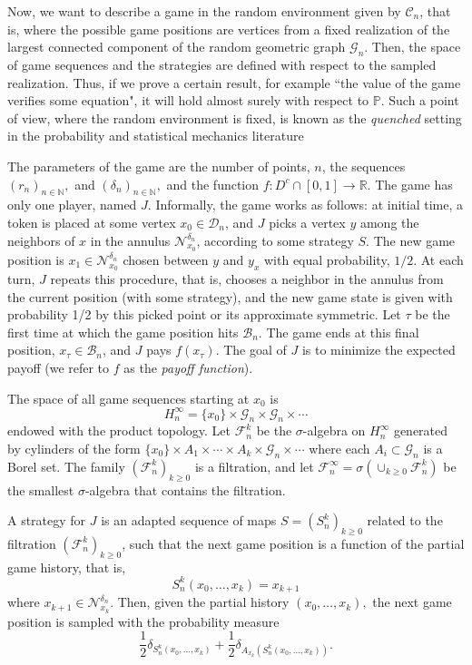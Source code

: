 \documentclass[11pt]{amsart}
\theoremstyle{definition}
\theoremstyle{remark}
\numberwithin{equation}{section}
\newcommand{\R}{{\mathbb R}}
\newcommand{\N}{{\mathbb N}}
\renewcommand{\P}{\mathbb{P}}
\newcommand{\G}{\mathcal{G}}
\newcommand{\Domain}{\mathcal{D}}
\newcommand{\B}{\mathcal{B}}
\newcommand{\C}{{\mathcal C}}
\newcommand{\Fc}{{\mathcal F}}
\newcommand{\Nc}{{\mathcal N}}
\begin{document}
Now, we want to describe a game in the random environment given by $\C_n$, that is, where the possible game positions are vertices from a fixed realization of the largest connected component of the random geometric graph $\G_n$.
Then, the space of game sequences and the strategies are defined with respect to the sampled realization.
Thus, if we prove a certain result, for example ``the value of the game verifies some equation", it will hold almost surely with respect to $\P$.
Such a point of view, where the random environment is fixed, is known as the \emph{quenched} setting in the probability and statistical mechanics literature

The parameters of the game are the number of points, $n$, the sequences $(r_n)_{n\in \N},$ and $(\delta_n)_{n\in \N},$ and the function $f\colon D^c\cap[0,1] \to \R$.
The game has only one player, named $J$. 
Informally, the game works as follows: at initial time, a token is placed at some vertex $x_0\in \Domain_n$, and $J$ picks a vertex $y$ among the neighbors of $x$ in the annulus $\Nc_{x_0}^{\delta_n}$, according to some strategy $S$.
The new game position is $x_1\in \Nc_{x_0}^{\delta_n}$ chosen between $y$ and $y_x$ with equal probability, $1/2$.
At each turn, $J$ repeats this procedure, that is, chooses a neighbor in the annulus from the current position (with some strategy), and the new game state is given with probability 1/2 by this picked point or its approximate symmetric.
Let $\tau$ be the first time at which the game position hits $\B_n$.
The game ends at this final position, $x_\tau\in\B_n$, and $J$ pays $f (x_\tau)$. 
The goal of $J$ is to minimize the expected payoff (we refer to $f$ as the \emph{payoff function}). 

The space of all game sequences starting at $x_0$ is
\[
H_n^{\infty} = \{x_0\} \times \G_n \times \G_n \times \cdots
\]
endowed with the product topology. 
Let $\Fc_n^k$ be the $\sigma$-algebra on $H_n^{\infty}$ generated by cylinders of the form $\{x_0\}\times A_1\times \cdots \times A_k\times \G_n \times \cdots$ where each $A_i\subset \G_n$ is a Borel set.
The family $(\Fc_n^k)_{k\geq 0}$ is a filtration, and let $\Fc_n^{\infty} = \sigma(\cup_{k\geq 0} \Fc_n^k)$ be the smallest $\sigma$-algebra that contains the filtration.

A strategy for $J$ is an adapted sequence of maps $S = (S_{n}^k)_{k\geq 0}$ related to the filtration $(\Fc_n^k)_{k\geq 0}$, such that the next game position is a function of the partial game history, that is, 
\[
S_{n}^k(x_0,\dots,x_k) 
=
x_{k+1} 
\]
where $x_{k+1} \in \Nc_{x_k}^{\delta_n}$.
Then, given the partial history $(x_0,\dots,x_k),$ the next game position is sampled with the probability measure
\begin{equation}
\label{prob-transicion}
\frac{1}{2} \delta_{S_{n}^k(x_0,\dots,x_k)}
+
\frac{1}{2} \delta_{A_{x_k}(S_{n}^k(x_0,\dots,x_k))}.
\end{equation}
\end{document}

